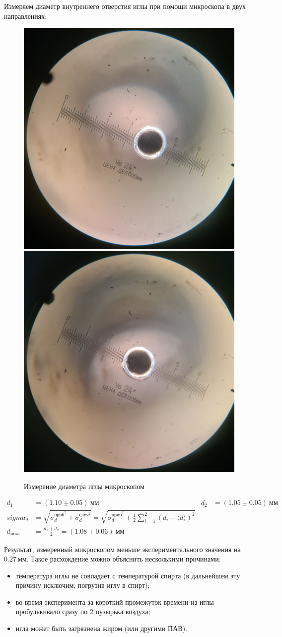 \documentclass[a4paper, 12pt]{article}
\begin{document}
			Измеряем диаметр внутреннего отверстия иглы при помощи микроскопа в двух направлениях:

			\begin{figure}[ht!]
				\includegraphics[width=.49\textwidth]{img/microscope1}\hfill
				\includegraphics[width=.49\textwidth]{img/microscope2}
				\caption{Измерение диаметра иглы микроскопом}
			\end{figure}

			\begin{align*}
				d_1 &= (1.10 \pm 0.05)~мм & d_2 &= (1.05 \pm 0.05)~мм \\
				sigma_d &= \sqrt{\sigma_d^{приб^2} + \sigma_d^{случ^2}} = \sqrt{\sigma_d^{приб^2} + \frac{1}{2}\sum_{i=1}^2(d_i - \langle d \rangle)^2} \\
				d_{игла} &= \frac{d_1 + d_2}{2} = (1.08 \pm 0.06)~мм
			\end{align*}

			Результат, измеренный микроскопом меньше экспериментального значения на $0.27~мм$. Такое расхождение можно объяснить несколькими причинами:
			\begin{itemize}
				\item температура иглы не совпадает с температурой спирта (в дальнейшем эту причину исключим, погрузив иглу в спирт);
				\item во время эксперимента за короткий промежуток времени из иглы пробулькивало сразу по 2 пузырька воздуха;
				\item игла может быть загрязнена жиром (или другими ПАВ).
			\end{itemize}
\end{document}
